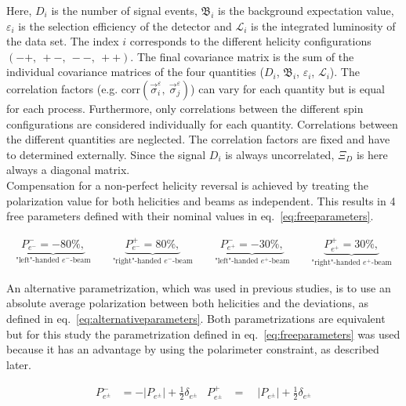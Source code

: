 \documentclass[a4paper]{article}
\begin{document}
Here, $D_{i}$ is the number of signal events, $\mathfrak{B}_{i}$ is the background expectation value, $\varepsilon_{i}$ is the selection efficiency of the detector and $\mathcal{L}_{i}$ is the integrated luminosity of the data set. The index $i$ corresponds to the different helicity configurations $\left(-+,\ +-,\ --,\ ++\right)$. The final covariance matrix is the sum of the individual covariance matrices of the four quantities ($D_{i}$, $\mathfrak{B}_{i}$, $\varepsilon_{i}$, $\mathcal{L}_{i}$). The correlation factors (e.g. $\text{corr}\left(\vec{\sigma}_{i}^{\varepsilon},\ \vec{\sigma}_{j}^{\varepsilon}\right)$) can vary for each quantity but is equal for each process. Furthermore, only correlations between the different spin configurations are considered individually for each quantity. Correlations between the different quantities are neglected. The correlation factors are fixed and have to determined externally. Since the signal $D_{i}$ is always uncorrelated, $\Xi_{D}$ is here always a diagonal matrix.\\
Compensation for a non-perfect helicity reversal is achieved by treating the polarization value for both helicities and beams as independent. This results in 4 free parameters defined with their nominal values in eq.~\ref{eq:freeparameters}.

\begin{align}
\underbrace{P_{e^{-}}^{-} = -80\%,}_{\text{"left"-handed }e^{-}\text{-beam}}\qquad
\underbrace{P_{e^{-}}^{+} =  80\%,}_{\text{"right"-handed }e^{-}\text{-beam}}\qquad
\underbrace{P_{e^{+}}^{-} = -30\%,}_{\text{"left"-handed }e^{+}\text{-beam}}\qquad
\underbrace{P_{e^{+}}^{+} =  30\%,}_{\text{"right"-handed }e^{+}\text{-beam}}
\label{eq:freeparameters}
\end{align}

An alternative parametrization, which was used in previous studies, is to use an absolute average polarization between both helicities and the deviations, as defined in eq.~\ref{eq:alternativeparameters}. Both parametrizations are equivalent but for this study the parametrization defined in eq.~\ref{eq:freeparameters} was used because it has an advantage by using the polarimeter constraint, as described later.

\begin{align}
	P_{e^{\pm}}^{-} & = -\left|P_{e^{\pm}}\right| + \tfrac{1}{2}\delta_{e^{\pm}} &  
	P_{e^{\pm}}^{+} & = \quad\left|P_{e^{\pm}}\right| + \tfrac{1}{2}\delta_{e^{\pm}}
	\label{eq:alternativeparameters}
\end{align}
\end{document}
